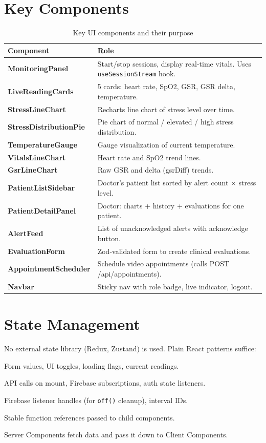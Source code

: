 \documentclass[12pt,a4paper]{report}
\begin{document}
\section{Key Components}

\begin{table}[H]\centering\renewcommand{\arraystretch}{1.4}
\begin{tabularx}{\linewidth}{>{\bfseries\small}l X}
\toprule
Component & Role \\
\midrule
MonitoringPanel & Start/stop sessions, display real-time vitals. Uses \texttt{useSessionStream} hook. \\
LiveReadingCards & 5 cards: heart rate, SpO2, GSR, GSR delta, temperature. \\
StressLineChart & Recharts line chart of stress level over time. \\
StressDistributionPie & Pie chart of normal / elevated / high stress distribution. \\
TemperatureGauge & Gauge visualization of current temperature. \\
VitalsLineChart & Heart rate and SpO2 trend lines. \\
GsrLineChart & Raw GSR and delta (gsrDiff) trends. \\
PatientListSidebar & Doctor's patient list sorted by alert count $\times$ stress level. \\
PatientDetailPanel & Doctor: charts + history + evaluations for one patient. \\
AlertFeed & List of unacknowledged alerts with acknowledge button. \\
EvaluationForm & Zod-validated form to create clinical evaluations. \\
AppointmentScheduler & Schedule video appointments (calls POST /api/appointments). \\
Navbar & Sticky nav with role badge, live indicator, logout. \\
\bottomrule
\end{tabularx}
\caption{Key UI components and their purpose}
\end{table}

\section{State Management}

No external state library (Redux, Zustand) is used. Plain React patterns suffice:

\begin{description}[leftmargin=3cm,labelwidth=2.5cm]
  \item[\texttt{useState}] Form values, UI toggles, loading flags, current readings.
  \item[\texttt{useEffect}] API calls on mount, Firebase subscriptions, auth state listeners.
  \item[\texttt{useRef}] Firebase listener handles (for \texttt{off()} cleanup), interval IDs.
  \item[\texttt{useCallback}] Stable function references passed to child components.
  \item[Props] Server Components fetch data and pass it down to Client Components.
\end{description}
\end{document}
